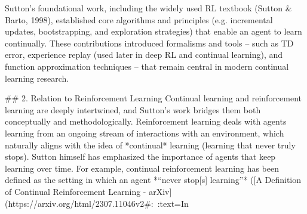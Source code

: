Sutton’s foundational work, including the widely used RL textbook (Sutton & Barto, 1998), established core algorithms and principles (e.g. incremental updates, bootstrapping, and exploration strategies) that enable an agent to learn continually. These contributions introduced formalisms and tools – such as TD error, experience replay (used later in deep RL and continual learning), and function approximation techniques – that remain central in modern continual learning research.

## 2. Relation to Reinforcement Learning
Continual learning and reinforcement learning are deeply intertwined, and Sutton’s work bridges them both conceptually and methodologically. Reinforcement learning deals with agents learning from an ongoing stream of interactions with an environment, which naturally aligns with the idea of *continual* learning (learning that never truly stops). Sutton himself has emphasized the importance of agents that keep learning over time. For example, continual reinforcement learning has been defined as the setting in which an agent *“never stop[s] learning”* ([A Definition of Continual Reinforcement Learning - arXiv](https://arxiv.org/html/2307.11046v2#:~:text=In%

